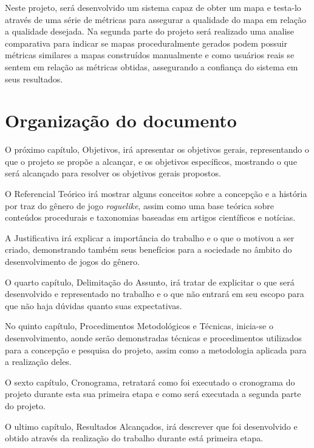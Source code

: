  Neste projeto, será desenvolvido um sistema capaz de obter um mapa e testa-lo através de uma série de métricas para assegurar a qualidade do mapa em relação a qualidade desejada. Na segunda parte do projeto será realizado uma analise comparativa para indicar se mapas proceduralmente gerados podem possuir métricas similares a mapas construídos manualmente e como usuários reais se sentem em relação as métricas obtidas, assegurando a confiança do sistema em seus resultados. 

\section*{Organização do documento}

O próximo capítulo, Objetivos, irá apresentar os objetivos gerais, representando o que o projeto se propõe a alcançar, e os objetivos específicos, mostrando o que será alcançado para resolver os objetivos gerais propostos. 

O Referencial Teórico irá mostrar alguns conceitos sobre a concepção e a história por traz do gênero de jogo \textit{roguelike}, assim como uma base teórica sobre conteúdos procedurais e taxonomias baseadas em artigos científicos e notícias.

A Justificativa irá explicar a importância do trabalho e o que o motivou a ser criado, demonstrando também seus benefícios para a sociedade no âmbito do desenvolvimento de jogos do gênero.

O quarto capítulo, Delimitação do Assunto, irá tratar de explicitar o que será desenvolvido e representado no trabalho e o que não entrará em seu escopo para que não haja dúvidas quanto suas expectativas. 

No quinto capítulo, Procedimentos Metodológicos e Técnicas, inicia-se o desenvolvimento, aonde serão demonstradas técnicas e procedimentos utilizados para a concepção e pesquisa do projeto, assim como a metodologia aplicada para a realização deles. 

O sexto capítulo, Cronograma, retratará como foi executado o cronograma do projeto durante esta sua primeira etapa e como será executada a segunda parte do projeto.

O ultimo capítulo, Resultados Alcançados, irá descrever que foi desenvolvido e obtido através da realização do trabalho durante está primeira etapa. 

